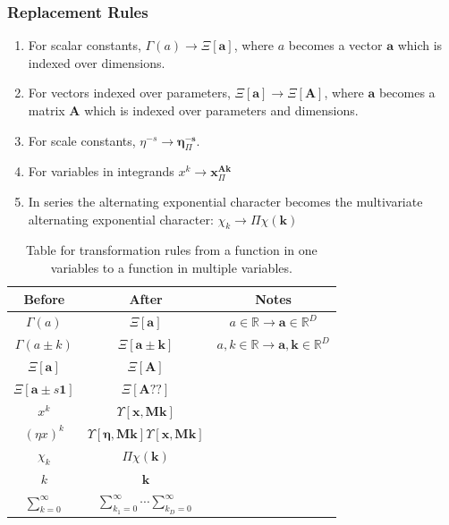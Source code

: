 \documentclass{article}
\begin{document}
\subsubsection{Replacement Rules}

\begin{enumerate}
\item For scalar constants, $\Gamma(a) \to \Xi[\mathbf{a}]$, where $a$ becomes a vector $\mathbf{a}$ which is indexed over dimensions.
\item For vectors indexed over parameters, $\Xi[\mathbf{a}] \to \Xi[\mathbf{A}]$, where $\mathbf{a}$ becomes a matrix $\mathbf{A}$ which is indexed over parameters and dimensions.
\item For scale constants, $\eta^{-s} \to \mathbf{\boldsymbol\eta}^{-\mathbf{s}}_\Pi$.
\item For variables in integrands $x^k \to \mathbf{x}^{\mathbf{Ak}}_\Pi$
\item In series the alternating exponential character becomes the multivariate alternating exponential character: $\chi_k \to \Pi\chi(\mathbf{k})$
\end{enumerate}

\begin{table}
\begin{tabular}{|c|c|c|}
\hline
Before & After & Notes \\
\hline
$\Gamma(a)$ & $\Xi[\mathbf{a}]$ & $a \in \mathbb{R} \to \mathbf{a} \in \mathbb{R}^D$\\
$\Gamma(a \pm k)$ & $\Xi[\mathbf{a}\pm \mathbf{k}]$ & $a,k \in \mathbb{R} \to \mathbf{a},\mathbf{k} \in \mathbb{R}^D$\\
$\Xi[\mathbf{a}]$ & $\Xi[\mathbf{A}]$ & \\
$\Xi[\mathbf{a}\pm s \mathbf{1}]$ & $\Xi[\mathbf{A} ??]$ & \\
\hline
$x^k$ & $\Upsilon[\mathbf{x},\mathbf{Mk}]$ & \\
$(\eta x)^k$ & $\Upsilon[\boldsymbol\eta,\mathbf{Mk}]\Upsilon[\mathbf{x},\mathbf{Mk}]$ & \\
\hline
$\chi_k$ & $\Pi\chi(\mathbf{k})$ & \\
$k$ & $\mathbf{k}$ & \\
$\sum_{k=0}^\infty$ & $\sum_{k_1=0}^\infty \cdots \sum_{k_D=0}^\infty$ & \\
\hline
\end{tabular}
\caption{Table for transformation rules from a function in one variables to a function in multiple variables.}
\end{table}
\end{document}
